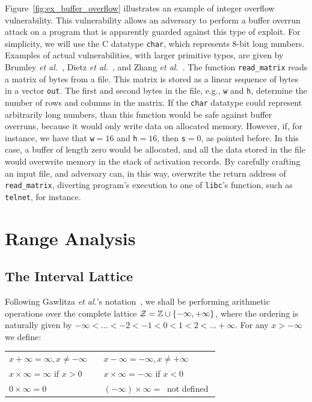 \documentclass[preprint]{sigplanconf}[10pt]
\begin{document}
Figure~\ref{fig:ex_buffer_overflow} illustrates an example of integer
overflow vulnerability.
This vulnerability allows an adversary to perform a buffer overrun attack
on a program that is apparently guarded against this type of exploit.
For simplicity, we will use the C datatype \texttt{char}, which represents
8-bit long numbers.
Examples of actual vulnerabilities, with larger primitive types, are given
by Brumley {\em et al.}~\cite{Brumley07}, Dietz {\em et al.}~\cite{Dietz12}, and
Zhang {\em et al.}~\cite{Zhang09}.
The function \texttt{read\_matrix} reads a matrix of bytes from a file.
This matrix is stored as a linear sequence of bytes in a vector \texttt{out}.
The first and second bytes in the file, e.g., \texttt{w} and \texttt{h},
determine the number of rows and columns in the matrix.
If the \texttt{char} datatype could represent arbitrarily long numbers, than this
function would be safe against buffer overruns, because it would only write data
on allocated memory.
However, if, for instance, we have that \texttt{w}$= 16$ and \texttt{h}$= 16$,
then \texttt{s}$= 0$, as pointed before.
In this case, a buffer of length zero would be allocated, and all the data
stored in the file would overwrite memory in the stack of activation records.
By carefully crafting an input file, and adversary can, in this way, overwrite
the return address of \texttt{read\_matrix}, diverting program's execution to
one of \texttt{libc}'s function, such as \texttt{telnet}, for instance.

\section{Range Analysis}
\label{sec:range}

\subsection{The Interval Lattice}
\label{sub:lattice}

Following Gawlitza {\em et al.}'s notation~\cite{Gawlitza09}, we shall be
performing arithmetic operations over the complete lattice
$\cal{Z} = \mathbb{Z} \cup \{-\infty, +\infty\}$, where the ordering is
naturally given by $-\infty < \ldots < -2 < -1 < 0 < 1 < 2 < \ldots +\infty$.
For any $x > -\infty$ we define:

\begin{tabular}{lcl}
$x + \infty = \infty, x \neq -\infty$ & \mbox{\hspace{0.1cm}} & $x - \infty = - \infty, x \neq +\infty$ \\
$x \times \infty = \infty$ if $x > 0$ & & $x \times \infty = -\infty$ if $x < 0$ \\
$0 \times \infty = 0$ & & $(-\infty) \times \infty = \ $ not defined $$ \\
\end{tabular}
\end{document}
